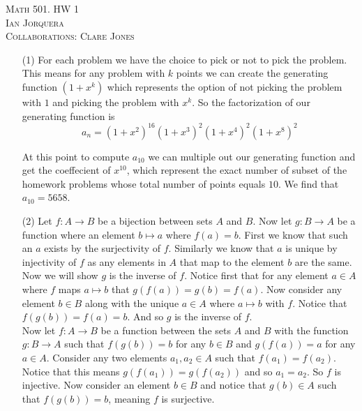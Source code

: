 \documentclass[12pt]{amsart}
\theoremstyle{definition}
\newcommand{\ra}{\rightarrow}
\begin{document}
\begin{center}
    \textsc{Math 501. HW 1\\ Ian Jorquera\\ Collaborations: Clare Jones}
\end{center}

\vspace{1em}


\begin{itemize}
\item[(1)] %
For each problem we have the choice to pick or not to pick the problem. This means for any problem with $k$ points we can create the generating function $(1+x^k)$ which represents the option of not picking the problem with $1$ and picking the problem with $x^k$. So the factorization of our generating function is 
$$a_n=(1+x^2)^{16}(1+x^3)^{2}(1+x^4)^{2}(1+x^8)^2$$

At this point to compute $a_{10}$ we can multiple out our generating function and get the coeffecient of $x^{10}$, which represent the exact number of subset of the homework problems whose total number of points equals $10$. We find that $a_{10}=5658$.\\


\item[(2)] %
Let $f:A\ra B$ be a bijection between sets $A$ and $B$. Now let $g:B\ra A$ be a function where an element $b\mapsto a$ where $f(a)=b$. First we know that such an $a$ exists by the surjectivity of $f$. Similarly we know that $a$ is unique by injectivity of $f$ as any elements in $A$ that map to the element $b$ are the same. Now we will show $g$ is the inverse of $f$. Notice first that for any element $a\in A$ where $f$ maps $a\mapsto b$ that $g(f(a))=g(b)=f(a)$. Now consider any element $b\in B$ along with the unique $a\in A$ where $a\mapsto b$ with $f$. Notice that $f(g(b))=f(a)=b$. And so $g$ is the inverse of $f$.\\

Now let $f:A\ra B$ be a function between the sets $A$ and $B$ with the function $g:B\ra A$ such that $f(g(b))=b$ for any $b\in B$ and $g(f(a))=a$ for any $a\in A$. Consider any two elements $a_1,a_2\in A$ such that $f(a_1)=f(a_2)$. Notice that this means $g(f(a_1))=g(f(a_2))$ and so $a_1=a_2$. So $f$ is injective. Now consider an element $b\in B$ and notice that $g(b)\in A$ such that $f(g(b))=b$, meaning $f$ is surjective.\\


\end{itemize}
\end{document}
